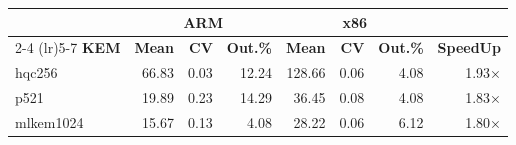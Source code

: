 \begin{table}[!ht]
\begin{tabular}{lrrr|rrr|r}
 \toprule
& \multicolumn{3}{c}{\bfseries ARM} & \multicolumn{3}{c}{\bfseries x86} &\\
\cmidrule(lr){2-4} \cmidrule(lr){5-7}
\textbf{KEM} & \textbf{Mean} & \textbf{CV} & \textbf{Out.\%} & \textbf{Mean} & \textbf{CV} & \textbf{Out.\%} & \textbf{SpeedUp}\\
\midrule
hqc256 & 66.83 & 0.03 & 12.24 & 128.66 & 0.06 & 4.08 & 1.93× \\
p521 & 19.89 & 0.23 & 14.29 & 36.45 & 0.08 & 4.08 & 1.83× \\
mlkem1024 & 15.67 & 0.13 & 4.08 & 28.22 & 0.06 & 6.12 & 1.80× \\
\bottomrule
\end{tabular}
\end{table}
